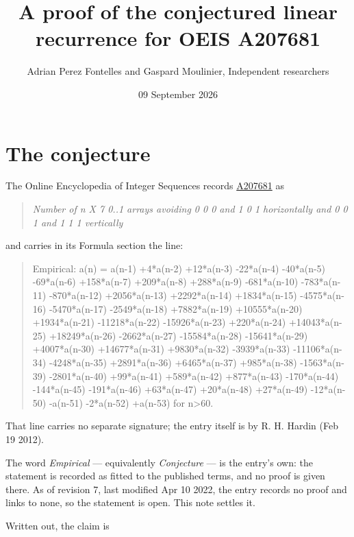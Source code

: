 \documentclass[11pt]{article}
\title{A proof of the conjectured linear recurrence for OEIS A207681}
\author{Adrian Perez Fontelles and Gaspard Moulinier, Independent researchers}
\date{09 September 2026}
\theoremstyle{definition}
\begin{document}
\maketitle
\section{The conjecture}

The Online Encyclopedia of Integer Sequences records \href{https://oeis.org/A207681}{A207681} as

\begin{quote}\itshape Number of n X 7 0..1 arrays avoiding 0 0 0 and 1 0 1 horizontally and 0 0 1 and 1 1 1 vertically\end{quote}

and carries in its Formula section the line:

\begin{quote}\ttfamily Empirical: a(n) = a(n-1) +4*a(n-2) +12*a(n-3) -22*a(n-4) -40*a(n-5) -69*a(n-6) +158*a(n-7) +209*a(n-8) +288*a(n-9) -681*a(n-10) -783*a(n-11) -870*a(n-12) +2056*a(n-13) +2292*a(n-14) +1834*a(n-15) -4575*a(n-16) -5470*a(n-17) -2549*a(n-18) +7882*a(n-19) +10555*a(n-20) +1934*a(n-21) -11218*a(n-22) -15926*a(n-23) +220*a(n-24) +14043*a(n-25) +18249*a(n-26) -2662*a(n-27) -15584*a(n-28) -15641*a(n-29) +4007*a(n-30) +14677*a(n-31) +9830*a(n-32) -3939*a(n-33) -11106*a(n-34) -4248*a(n-35) +2891*a(n-36) +6465*a(n-37) +985*a(n-38) -1563*a(n-39) -2801*a(n-40) +99*a(n-41) +589*a(n-42) +877*a(n-43) -170*a(n-44) -144*a(n-45) -191*a(n-46) +63*a(n-47) +20*a(n-48) +27*a(n-49) -12*a(n-50) -a(n-51) -2*a(n-52) +a(n-53) for n>60.\end{quote}

That line carries no separate signature; the entry itself is by R. H. Hardin (Feb 19 2012).

The word {\itshape Empirical} --- equivalently {\itshape Conjecture} --- is the entry's own: the statement is recorded as fitted to the published terms, and no proof is given there. As of revision 7, last modified Apr 10 2022, the entry records no proof and links to none, so the statement is open. This note settles it.

Written out, the claim is
\end{document}
